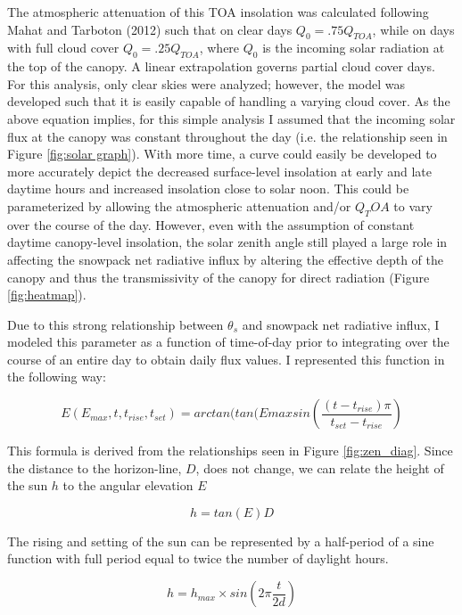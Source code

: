 \documentclass[
10pt, %
letterpaper, %
oneside, %
headinclude,footinclude, %
BCOR5mm, %
]{scrartcl}
\begin{document}
The atmospheric attenuation of this TOA insolation was calculated following Mahat and Tarboton (2012) such that on clear days $Q_0 = .75Q_{TOA}$, while on days with full cloud cover $Q_0 = .25Q_{TOA}$, where $Q_0$ is the incoming solar radiation at the top of the canopy. A linear extrapolation governs partial cloud cover days. For this analysis, only clear skies were analyzed; however, the model was developed such that it is easily capable of handling a varying cloud cover. As the above equation implies, for this simple analysis I assumed that the incoming solar flux at the canopy was constant throughout the day (i.e. the relationship seen in Figure \ref{fig:solar graph}). With more time, a curve could easily be developed to more accurately depict the decreased surface-level insolation at early and late daytime hours and increased insolation close to solar noon. This could be parameterized by allowing the atmospheric attenuation and/or $Q_TOA$ to vary over the course of the day. However, even with the assumption of constant daytime canopy-level insolation, the solar zenith angle still played a large role in affecting the snowpack net radiative influx by altering the effective depth of the canopy and thus the transmissivity of the canopy for direct radiation (Figure \ref{fig:heatmap}).

Due to this strong relationship between $\theta_s$ and snowpack net radiative influx, I modeled this parameter as a function of time-of-day prior to integrating over the course of an entire day to obtain daily flux values. I represented this function in the following way:

\begin{equation} \label{zen_func} E(E_{max},t,t_{rise},t_{set}) = arctan(tan(E{max}sin(\frac{(t-t_{rise})\pi}{t_{set}-t_{rise}}) \end{equation}

This formula is derived from the relationships seen in Figure \ref{fig:zen_diag}. Since the distance to the horizon-line, $D$, does not change, we can relate the height of the sun $h$ to the angular elevation $E$

\begin{equation} \label{sub_h} h = tan(E)D \end{equation}

The rising and setting of the sun can be represented by a half-period of a sine function with full period equal to twice the number of daylight hours.

$$h = h_{max} \times sin(2\pi \frac{t}{2d})$$
\end{document}
